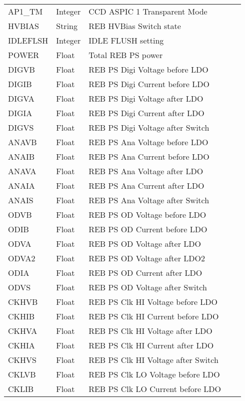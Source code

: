 \begin{longtable}{l l l l l}
AP1\_TM & Integer & CCD ASPIC 1 Transparent Mode \\
HVBIAS & String & REB HVBias Switch state \\
IDLEFLSH & Integer & IDLE FLUSH setting \\
POWER & Float & Total REB PS power \\
DIGVB & Float & REB PS Digi Voltage before LDO          \\
DIGIB & Float & REB PS Digi Current before LDO          \\
DIGVA & Float & REB PS Digi Voltage after LDO           \\
DIGIA & Float & REB PS Digi Current after LDO         \\
DIGVS & Float & REB PS Digi Voltage after Switch       \\
ANAVB & Float & REB PS Ana Voltage before LDO           \\
ANAIB & Float & REB PS Ana Current before LDO           \\
ANAVA & Float & REB PS Ana Voltage after LDO            \\
ANAIA & Float & REB PS Ana  Current after LDO          \\
ANAIS & Float & REB PS Ana Voltage after Switch        \\
ODVB & Float & REB PS OD Voltage before LDO            \\
ODIB & Float & REB PS OD Current before LDO            \\
ODVA & Float & REB PS OD Voltage after LDO             \\
ODVA2 & Float & REB PS OD Voltage after LDO2            \\
ODIA & Float & REB PS OD Current after LDO             \\
ODVS & Float & REB PS OD Voltage after Switch          \\
CKHVB & Float & REB PS Clk HI Voltage before LDO        \\
CKHIB & Float & REB PS Clk HI Current before LDO        \\
CKHVA & Float & REB PS Clk HI Voltage after LDO         \\
CKHIA & Float & REB PS Clk HI Current after LDO        \\
CKHVS & Float & REB PS Clk HI Voltage after Switch      \\
CKLVB & Float & REB PS Clk LO Voltage before LDO        \\
CKLIB & Float & REB PS Clk LO Current before LDO        \\

\end{longtable}
